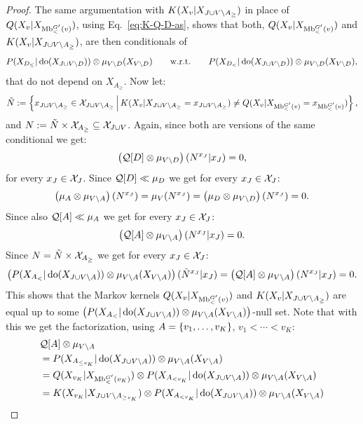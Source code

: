 \begin{Thm}
\begin{proof}
      The same argumentation with $K(X_v|X_{J \cup V \setminus A_\ge})$ in place of $Q(X_v|X_{\mathrm{Mb}^{G'}_<(v)})$, 
      using Eq.\ \ref{eq:K-Q-D-as}, shows that both, $Q(X_v|X_{\mathrm{Mb}^{G'}_<(v)})$ and $K(X_v|X_{J \cup V \setminus A_\ge})$, 
    are then conditionals of
    \[  P(X_{D_\le}|\operatorname{do}(X_{J \cup V \setminus D})) \otimes \mu_{V\setminus D}(X_{V\setminus D}) \qquad \text{w.r.t.} \qquad
          P(X_{D_<}|\operatorname{do}(X_{J \cup V \setminus D}))\otimes \mu_{V\setminus D}(X_{V\setminus D}), \] 
    that do not depend on $X_{A_\ge}$.
    Now let:
       \[ \tilde N := \left \{ x_{J \cup V \setminus A_\ge} \in \mathcal{X}_{J \cup V \setminus A_\ge}  
            \,\middle|\, K(X_v|X_{J \cup V \setminus A_\ge}=x_{J \cup V \setminus A_\ge})
        \neq Q(X_v|X_{\mathrm{Mb}^{G'}_<(v)} = x_{\mathrm{Mb}^{G'}_<(v)}) \right \}, \]
        and $N:= \tilde N \times \mathcal{X}_{A_\ge} \subseteq \mathcal{X}_{J \cup V}$. 
        Again, since both are versions of the same conditional we get:
        \[ \left ( \mathcal{Q}[D] \otimes \mu_{V \setminus D} \right ) (N^{x_J}|x_J) = 0,\]
        for every $x_J \in \mathcal{X}_J$. Since $\mathcal{Q}[D] \ll \mu_D$ we get for every $x_J \in \mathcal{X}_J$:
        \[ \left ( \mu_A \otimes \mu_{V \setminus A} \right ) (N^{x_J}) = \mu_V (N^{x_J}) =\left ( \mu_D \otimes \mu_{V \setminus D} \right ) (N^{x_J}) = 0.\]
        Since also $\mathcal{Q}[A] \ll \mu_A$ we get for every $x_J \in \mathcal{X}_J$:
            \[ \left ( \mathcal{Q}[A] \otimes \mu_{V \setminus A} \right ) (N^{x_J}|x_J) = 0.\]
        Since $N= \tilde N \times \mathcal{X}_{A_\ge}$ we get for every $x_J \in \mathcal{X}_J$:
        \[ \left ( P(X_{A_<}|\operatorname{do}(X_{J \cup V \setminus A})) \otimes \mu_{V\setminus A}(X_{V \setminus A}) \right ) (\tilde N^{x_J}|x_J) = 
        \left ( \mathcal{Q}[A] \otimes \mu_{V \setminus A} \right ) (N^{x_J}|x_J) = 0.  \]
       This shows that the Markov kernels $Q(X_v|X_{\mathrm{Mb}^{G'}_<(v)})$ and $K(X_v|X_{J \cup V \setminus A_\ge})$ are equal up to some
        $\left ( P(X_{A_<}|\operatorname{do}(X_{J \cup V \setminus A})) \otimes \mu_{V\setminus A}(X_{V \setminus A}) \right )$-null set.
        Note that with this we get the factorization, using $A=\left \{ v_1,\dots,v_K \right \}$, $v_1 < \cdots < v_K$:
        \begin{align*}
           & \Qf[A] \otimes \mu_{V \sm A} \\
           & = P(X_{A_{\le v_K}}|\doit(X_{J \cup V \sm A})) \otimes \mu_{V \sm A}(X_{V \sm A}) \\
           & = Q(X_{v_K}|X_{\MBl^{G'}_<(v_K)}) \otimes P(X_{A_{< v_K}}|\doit(X_{J \cup V \sm A})) \otimes \mu_{V \sm A}(X_{V \sm A}) \\
           & = K(X_{v_K}|X_{J \cup V \sm A_{\ge v_K}}) \otimes P(X_{A_{< v_K}}|\doit(X_{J \cup V \sm A})) \otimes \mu_{V \sm A}(X_{V \sm A}) \\

\end{align*}
\end{proof}
\end{Thm}
